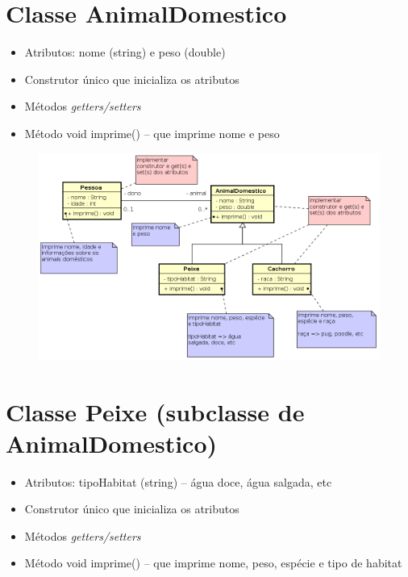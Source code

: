 \documentclass[12pt]{article}
\begin{document}
\thispagestyle{empty}

\section*{Classe {\sf AnimalDomestico}}

\begin{itemize}

\item Atributos: nome ({\sf string}) e peso ({\sf double})

\item Construtor único que inicializa os atributos

\item Métodos {\it getters/setters}

\item Método {\sf void imprime()} -- que imprime nome e peso

\end{itemize}

  \begin{figure}[htbp]
    \centering \includegraphics[width=15cm]{animal.png}
  \end{figure}
  
\section*{Classe {\sf Peixe} (subclasse de {\sf AnimalDomestico})}

\begin{itemize}

\item Atributos: tipoHabitat ({\sf string}) -- água doce, água salgada, etc

\item Construtor único que inicializa os atributos       

\item Métodos {\it getters/setters}

\item Método {\sf void imprime()} -- que imprime nome, peso, espécie e tipo de habitat

\end{itemize}
\end{document}
